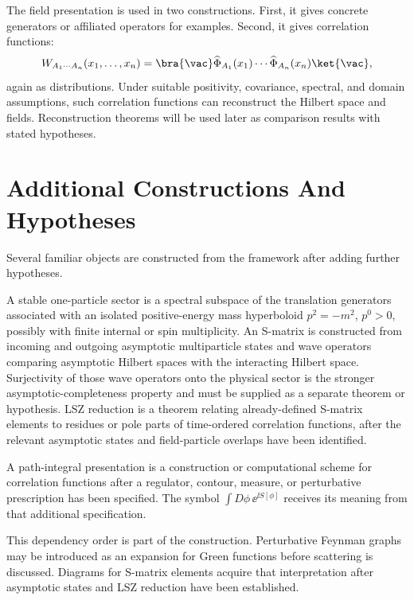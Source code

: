The field presentation is used in two constructions. First, it gives concrete
generators or affiliated operators for examples. Second, it gives correlation
functions:
\[
  W_{A_1\cdots A_n}(x_1,\ldots,x_n)
  =
  \bra{\vac}
  \widehat\Phi_{A_1}(x_1)\cdots
  \widehat\Phi_{A_n}(x_n)
  \ket{\vac},
\]
again as distributions. Under suitable positivity, covariance, spectral, and
domain assumptions, such correlation functions can reconstruct the Hilbert
space and fields. Reconstruction theorems will be used later as comparison
results with stated hypotheses.

\section{Additional Constructions And Hypotheses}

Several familiar objects are constructed from the framework after adding
further hypotheses.

\begin{definition}
\label{def:first-derived-objects-extra-hypotheses}
A stable one-particle sector is a spectral subspace of the translation
generators associated with an isolated positive-energy mass hyperboloid
\(p^2=-m^2\), \(p^0>0\), possibly with finite internal or spin multiplicity.
An S-matrix is constructed from incoming and outgoing asymptotic multiparticle
states and wave operators comparing asymptotic Hilbert spaces with the
interacting Hilbert space.  Surjectivity of those wave operators onto the
physical sector is the stronger asymptotic-completeness property and must be
supplied as a separate theorem or hypothesis.  LSZ reduction is a theorem
relating already-defined S-matrix elements to residues or pole parts of
time-ordered correlation functions, after the relevant asymptotic states and
field-particle overlaps have been identified.

A path-integral presentation is a construction or computational scheme for
correlation functions after a regulator, contour, measure, or perturbative
prescription has been specified. The symbol
\(\int D\phi\,\ee^{\ii S[\phi]}\) receives its meaning from that additional
specification.
\end{definition}

This dependency order is part of the construction. Perturbative Feynman graphs
may be introduced as an expansion for Green functions before scattering is
discussed. Diagrams for S-matrix elements acquire that interpretation after
asymptotic states and LSZ reduction have been established.

